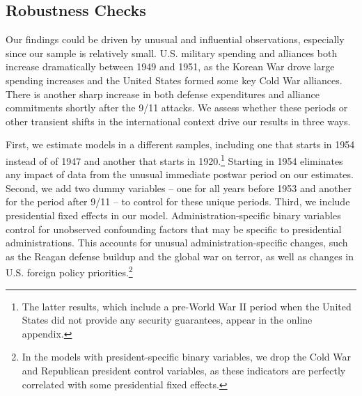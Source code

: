 \documentclass[12pt,hidelinks]{article}
\begin{document}
\subsection*{Robustness Checks}

Our findings could be driven by unusual and influential observations, especially since our sample is relatively small. 
U.S. military spending and alliances both increase dramatically between 1949 and 1951, as the Korean War drove large spending increases and the United States formed some key Cold War alliances.
There is another sharp increase in both defense expenditures and alliance commitments shortly after the 9/11 attacks.  
We assess whether these periods or other transient shifts in the international context drive our results in three ways.


First, we estimate models in a different samples, including one that starts in 1954 instead of of 1947 and another that starts in 1920.\footnote{The latter results, which include a pre-World War II period when the United States did not provide any security guarantees, appear in the online appendix.}
Starting in 1954 eliminates any impact of data from the unusual immediate postwar period on our estimates. 
Second, we add two dummy variables -- one for all years before 1953 and another for the period after 9/11 -- to control for these unique periods. 
Third, we include presidential fixed effects in our model.
Administration-specific binary variables control for unobserved confounding factors that may be specific to presidential administrations.
This accounts for unusual administration-specific changes, such as the Reagan defense buildup and the global war on terror, as well as changes in U.S. foreign policy priorities.\footnote{In the models with president-specific binary variables, we drop the Cold War and Republican president control variables, as these indicators are perfectly correlated with some presidential fixed effects.} 
\end{document}
